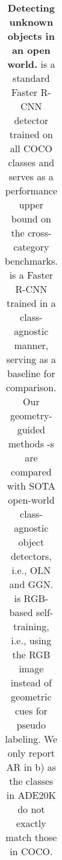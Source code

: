 \documentclass{article} \usepackage{iclr2023_conference,times}
\begin{document}
\begin{table}[t]
\begin{subtable}{\linewidth}
{{{\begin{tabular}{l|l|l|l|l|l|l|l|l|l|l}
                  \bottomrule
						\end{tabular}
}}}
    \caption{\textbf{Cross-category benchmarks}}\label{table:cross-category-main}
\end{subtable}\\ \vspace{3pt}
\begin{subtable}{\linewidth}
\centering
{}
    \caption{\textbf{Cross-dataset benchmarks}}\label{table:cross-dataset-main}
\end{subtable}
\caption{\textbf{Detecting unknown objects in an open world.}  is a standard Faster R-CNN detector trained on all COCO classes and serves as a performance upper bound on the cross-category benchmarks. 
     is a Faster R-CNN trained in a class-agnostic manner, serving as a baseline for comparison.
    Our geometry-guided methods -s are compared with SOTA open-world class-agnostic object detectors, i.e., OLN and GGN.  is RGB-based self-training, i.e., using the RGB image instead of geometric cues for pseudo labeling. We only report AR in b) as the classes in ADE20K do not exactly match those in COCO.}\label{table: main_results}
\end{table}
 
\end{document}
